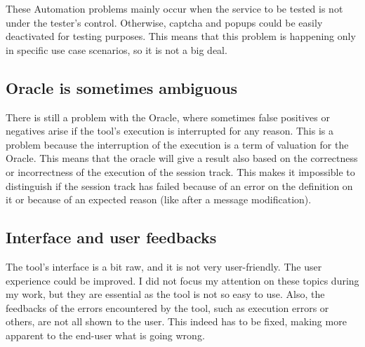 These Automation problems mainly occur when the service to be tested is not under the tester's control. Otherwise, captcha and popups could be easily deactivated for testing purposes. This means that this problem is happening only in specific use case scenarios, so it is not a big deal.

\subsection{Oracle is sometimes ambiguous}
There is still a problem with the Oracle, where sometimes false positives or negatives arise if the tool's execution is interrupted for any reason. This is a problem because the interruption of the execution is a term of valuation for the Oracle. This means that the oracle will give a result also based on the correctness or incorrectness of the execution of the \gls{session track}. This makes it impossible to distinguish if the \gls{session track} has failed because of an error on the definition on it or because of an expected reason (like after a message modification).

\subsection{Interface and user feedbacks}
The tool's interface is a bit raw, and it is not very user-friendly. The user experience could be improved. I did not focus my attention on these topics during my work, but they are essential as the tool is not so easy to use. Also, the feedbacks of the errors encountered by the tool, such as execution errors or others, are not all shown to the user. This indeed has to be fixed, making more apparent to the end-user what is going wrong.





